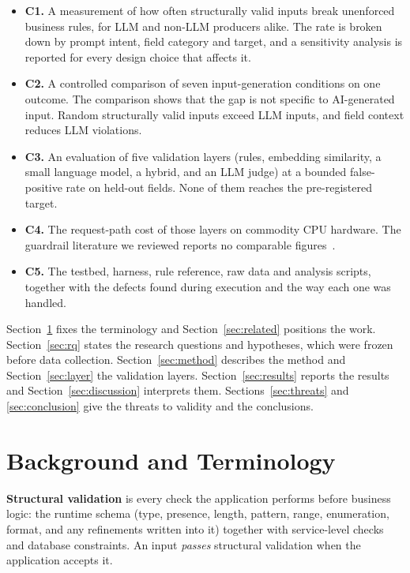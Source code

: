 \documentclass[conference]{IEEEtran}
\begin{document}
\begin{itemize}
  \item \textbf{C1.} A measurement of how often structurally valid inputs break unenforced business
  rules, for LLM and non-LLM producers alike. The rate is broken down by prompt intent, field category
  and target, and a sensitivity analysis is reported for every design choice that affects it.
  \item \textbf{C2.} A controlled comparison of seven input-generation conditions on one outcome. The
  comparison shows that the gap is not specific to AI-generated input. Random structurally valid inputs
  exceed LLM inputs, and field context reduces LLM violations.
  \item \textbf{C3.} An evaluation of five validation layers (rules, embedding similarity, a small
  language model, a hybrid, and an LLM judge) at a bounded false-positive rate on held-out fields. None
  of them reaches the pre-registered target.
  \item \textbf{C4.} The request-path cost of those layers on commodity CPU hardware. The guardrail
  literature we reviewed reports no comparable
  figures~\cite{jacob2025promptshield,ahmed2026reflexguard,saleem2026layered,wang2026sokguardrails}.
  \item \textbf{C5.} The testbed, harness, rule reference, raw data and analysis scripts, together with
  the defects found during execution and the way each one was handled.
\end{itemize}

Section~\ref{sec:background} fixes the terminology and Section~\ref{sec:related} positions the work.
Section~\ref{sec:rq} states the research questions and hypotheses, which were frozen before data
collection. Section~\ref{sec:method} describes the method and Section~\ref{sec:layer} the validation
layers. Section~\ref{sec:results} reports the results and Section~\ref{sec:discussion} interprets them.
Sections~\ref{sec:threats} and \ref{sec:conclusion} give the threats to validity and the conclusions.

\section{Background and Terminology}
\label{sec:background}

\textbf{Structural validation} is every check the application performs before business logic: the
runtime schema (type, presence, length, pattern, range, enumeration, format, and any refinements
written into it) together with service-level checks and database constraints. An input
\emph{passes} structural validation when the application accepts it.
\end{document}
